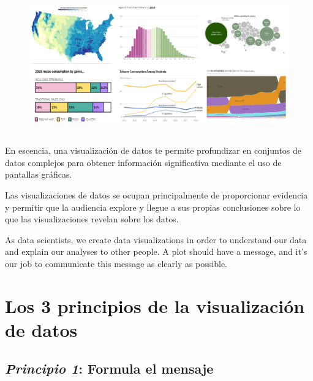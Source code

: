 \documentclass[
  letterpaper,
  DIV=11,
  numbers=noendperiod]{scrartcl}
\begin{document}
\begin{figure}

{\centering \includegraphics[width=8.47917in,height=\textheight]{images/clipboard-3803538817.png}

}

\end{figure}

\hypertarget{section-1}{%
\subsection{}\label{section-1}}

En escencia, una visualización de datos te permite profundizar en
conjuntos de datos complejos para obtener información significativa
mediante el uso de pantallas gráficas.

Las visualizaciones de datos se ocupan principalmente de proporcionar
evidencia y permitir que la audiencia explore y llegue a sus propias
conclusiones sobre lo que las visualizaciones revelan sobre los datos.

As data scientists, we create data visualizations in order to understand
our data and explain our analyses to other people. A plot should have a
message, and it's our job to communicate this message as clearly as
possible.

\hypertarget{los-3-principios-de-la-visualizaciuxf3n-de-datos}{%
\section{Los 3 principios de la visualización de
datos}\label{los-3-principios-de-la-visualizaciuxf3n-de-datos}}

\hypertarget{principio-1-formula-el-mensaje}{%
\subsection{\texorpdfstring{\textbf{\emph{Principio 1}:} Formula el
mensaje}{Principio 1: Formula el mensaje}}\label{principio-1-formula-el-mensaje}}
\end{document}
